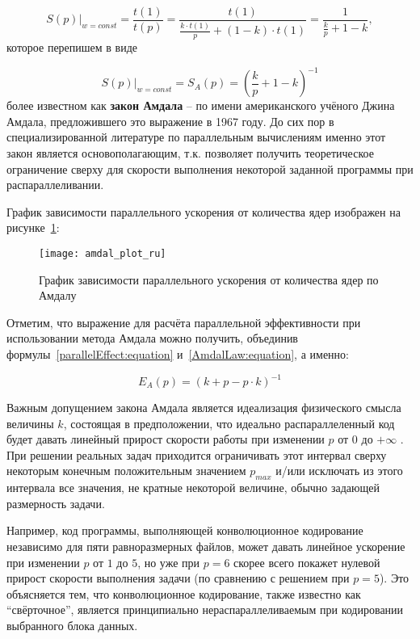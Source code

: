 \begin{equation}
    \left.S(p)\right|_{w = const} = \frac{t(1)}{t(p)} = \frac{t(1)}{{\displaystyle\frac{k \cdot t(1)}{p}} + (1 - k) \cdot t(1)} = \frac{1}{{\displaystyle\frac{k}{p}} + 1 - k},
\end{equation}
которое перепишем в виде

\begin{equation}
    \label{AmdalLaw:equation}
    \left.S(p)\right|_{w=const} = S_A(p) = \left(\frac{k}{p} + 1 - k\right)^{-1}
\end{equation}
более известном как \textbf{закон Амдала} – по имени американского учёного Джина Амдала, предложившего это выражение в 1967 году. До сих пор в специализированной литературе по параллельным вычислениям именно этот закон является основополагающим, т.к. позволяет получить теоретическое ограничение сверху для скорости выполнения некоторой заданной программы при распараллеливании.

График зависимости параллельного ускорения от количества ядер изображен на рисунке~\ref{GraphAmdalSFromP:image}:

\begin{figure}[H]
    \texttt{[image: amdal\_plot\_ru]}
    \caption{График зависимости параллельного ускорения от количества ядер по Амдалу}
    \label{GraphAmdalSFromP:image}
\end{figure}

Отметим, что выражение для расчёта параллельной эффективности при использовании метода Амдала можно получить, объединив формулы~\eqref{parallelEffect:equation} и~\eqref{AmdalLaw:equation}, а именно:


\begin{equation}
    E_A(p) = \left(k + p - p \cdot k\right)^{-1}
\end{equation}

Важным допущением закона Амдала является идеализация физического смысла величины $k$, состоящая в предположении, что идеально распараллеленный код будет давать линейный прирост скорости работы при изменении $p$ от $0$ до $+\infty$ . При решении реальных задач приходится ограничивать этот интервал сверху некоторым конечным положительным значением $p_{max}$ и/или исключать из этого интервала все значения, не кратные некоторой величине, обычно задающей размерность задачи.

Например, код программы, выполняющей конволюционное кодирование независимо для пяти равноразмерных файлов, может давать линейное ускорение при изменении $p$ от $1$ до $5$, но уже при $p=6$ скорее всего покажет нулевой прирост скорости выполнения задачи (по сравнению с решением при $p=5$). Это объясняется тем, что  конволюционное кодирование, также известно как ``свёрточное'', является принципиально нераспараллеливаемым при кодировании выбранного блока данных.
